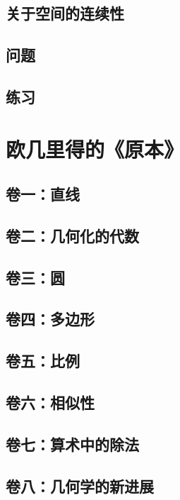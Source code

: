 \documentclass[cn,fancy,blue,11pt]{elegantbook}
\begin{document}
\section{关于空间的连续性}

\section{问题}

\section{练习}

\chapter{欧几里得的《原本》}

\section{卷一：直线}

\section{卷二：几何化的代数}

\section{卷三：圆}

\section{卷四：多边形}

\section{卷五：比例}

\section{卷六：相似性}

\section{卷七：算术中的除法}

\section{卷八：几何学的新进展}
\end{document}
